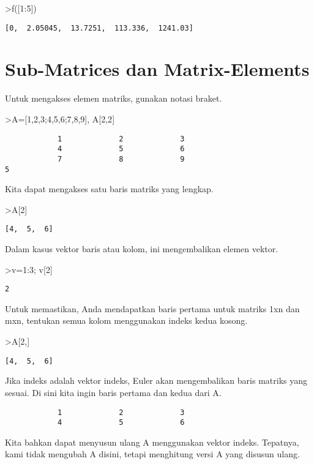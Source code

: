 \documentclass[
]{book}
\begin{document}
\textgreater f({[}1:5{]})

\begin{verbatim}
[0,  2.05045,  13.7251,  113.336,  1241.03]
\end{verbatim}

\section{Sub-Matrices dan Matrix-Elements}\label{sub-matrices-dan-matrix-elements}

Untuk mengakses elemen matriks, gunakan notasi braket.

\textgreater A={[}1,2,3;4,5,6;7,8,9{]}, A{[}2,2{]}

\begin{verbatim}
            1             2             3 
            4             5             6 
            7             8             9 
5
\end{verbatim}

Kita dapat mengakses satu baris matriks yang lengkap.

\textgreater A{[}2{]}

\begin{verbatim}
[4,  5,  6]
\end{verbatim}

Dalam kasus vektor baris atau kolom, ini mengembalikan elemen vektor.

\textgreater v=1:3; v{[}2{]}

\begin{verbatim}
2
\end{verbatim}

Untuk memastikan, Anda mendapatkan baris pertama untuk matriks 1xn dan mxn, tentukan semua kolom menggunakan indeks kedua kosong.

\textgreater A{[}2,{]}

\begin{verbatim}
[4,  5,  6]
\end{verbatim}

Jika indeks adalah vektor indeks, Euler akan mengembalikan baris matriks yang sesuai. Di sini kita ingin baris pertama dan kedua dari A.

\begin{verbatim}
            1             2             3 
            4             5             6 
\end{verbatim}

Kita bahkan dapat menyusun ulang A menggunakan vektor indeks. Tepatnya, kami tidak mengubah A disini, tetapi menghitung versi A yang disusun ulang.
\end{document}
